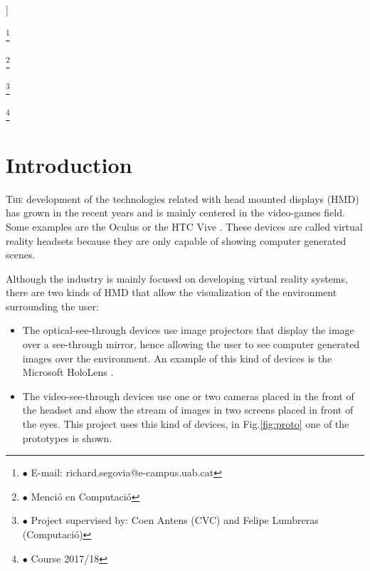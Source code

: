 \documentclass[10pt,a4paper,twocolumn,twoside]{article}
\newcommand\blfootnote[1]{%
  \begingroup
  \renewcommand\thefootnote{}\footnote{#1}%
  \addtocounter{footnote}{-1}%
  \endgroup
}
\begin{document}
\begin{@twocolumnfalse}
\begin{center}
	\bigskip
	
	{\vrule depth 0pt height 0.5pt width 4cm\hspace{7.5pt}%
	\hspace{7.5pt}\vrule depth 0pt height 0.5pt width 4cm\relax}
	
	\end{center}
	
	\bigskip
	\end{@twocolumnfalse}]
	
	\blfootnote{$\bullet$ E-mail: richard.segovia@e-campus.uab.cat}
	\blfootnote{$\bullet$ Menció en Computació}
	\blfootnote{$\bullet$ Project supervised by: Coen Antens (CVC) and Felipe Lumbreras (Computació)}
	\blfootnote{$\bullet$ Course 2017/18}
	
	\section{Introduction}
	
	\lettrine[lines=3]{T}{he} development of the technologies related with head mounted displays (HMD) has grown in the recent years and is mainly centered in the video-games field. Some examples are the Oculus \cite{web:oculus} or the HTC Vive \cite{web:vive}. These devices are called virtual reality headsets because they are only capable of showing computer generated scenes.  
	
	Although the industry is mainly focused on developing virtual reality systems, there are two kinds of HMD that allow the visualization of the environment surrounding the user:  

	\begin{itemize}
	\item The optical-see-through devices use image projectors that display the image over a see-through mirror, hence allowing the user to see computer generated images over the environment. An example of this kind of devices is the Microsoft HoloLens \cite{web:hololens}.
	\item The video-see-through devices use one or two cameras placed in the front of the headset and show the stream of images in two screens placed in front of the eyes. This project uses this kind of devices, in Fig.\ref{fig:proto} one of the prototypes is shown. 
	\end{itemize}
\end{document}

